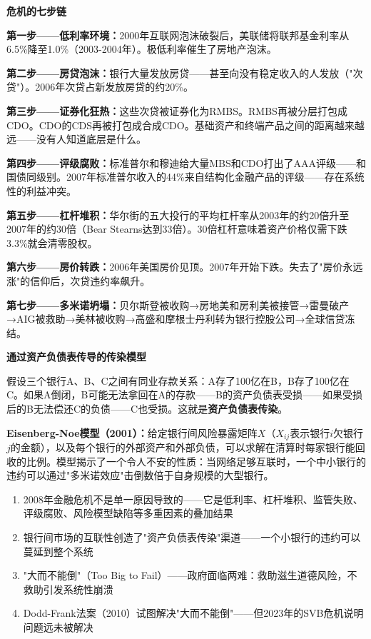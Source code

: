 \documentclass[a4paper,11pt]{ctexbook}
\begin{document}
\begin{qualitative}
\textbf{危机的七步链}

\textbf{第一步——低利率环境：}2000年互联网泡沫破裂后，美联储将联邦基金利率从6.5\%降至1.0\%（2003-2004年）。极低利率催生了房地产泡沫。

\textbf{第二步——房贷泡沫：}银行大量发放房贷——甚至向没有稳定收入的人发放（"次贷"）。2006年次贷占新发放房贷的约20\%。

\textbf{第三步——证券化狂热：}这些次贷被证券化为RMBS。RMBS再被分层打包成CDO。CDO的CDS再被打包成合成CDO。基础资产和终端产品之间的距离越来越远——没有人知道底层是什么。

\textbf{第四步——评级腐败：}标准普尔和穆迪给大量MBS和CDO打出了AAA评级——和国债同级别。2007年标准普尔收入的44\%来自结构化金融产品的评级——存在系统性的利益冲突。

\textbf{第五步——杠杆堆积：}华尔街的五大投行的平均杠杆率从2003年的约20倍升至2007年的约30倍（Bear Stearns达到33倍）。30倍杠杆意味着资产价格仅需下跌3.3\%就会清零股权。

\textbf{第六步——房价转跌：}2006年美国房价见顶。2007年开始下跌。失去了"房价永远涨"的信仰后，次贷违约率飙升。

\textbf{第七步——多米诺坍塌：}贝尔斯登被收购→房地美和房利美被接管→雷曼破产→AIG被救助→美林被收购→高盛和摩根士丹利转为银行控股公司→全球信贷冻结。
\end{qualitative}

\begin{quantitative}
\textbf{通过资产负债表传导的传染模型}

假设三个银行A、B、C之间有同业存款关系：A存了100亿在B，B存了100亿在C。如果A倒闭，B可能无法拿回在A的存款——B的资产负债表受损——如果受损后的B无法偿还C的负债——C也受损。这就是\textbf{资产负债表传染}。

\textbf{Eisenberg-Noe模型（2001）：}给定银行间风险暴露矩阵$X$（$X_{ij}$表示银行$i$欠银行$j$的金额），以及每个银行的外部资产和外部负债，可以求解在清算时每家银行能回收的比例。模型揭示了一个令人不安的性质：当网络足够互联时，一个中小银行的违约可以通过"多米诺效应"击倒数倍于自身规模的大型银行。
\end{quantitative}

\begin{lessonsummary}
\begin{enumerate}
  \item 2008年金融危机不是单一原因导致的——它是低利率、杠杆堆积、监管失败、评级腐败、风险模型缺陷等多重因素的叠加结果
  \item 银行间市场的互联性创造了"资产负债表传染"渠道——一个小银行的违约可以蔓延到整个系统
  \item "大而不能倒"（Too Big to Fail）——政府面临两难：救助滋生道德风险，不救助引发系统性崩溃
  \item Dodd-Frank法案（2010）试图解决"大而不能倒"——但2023年的SVB危机说明问题远未被解决
\end{enumerate}
\end{lessonsummary}
\end{document}
